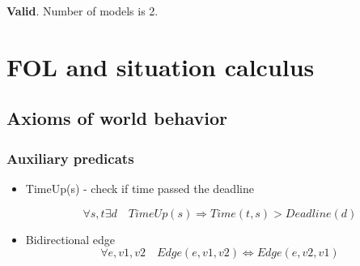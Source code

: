 \documentclass{article}                     %
\begin{document}
	\textbf{Valid}.  Number of models is 2.
	
	
	\section{FOL and situation calculus}		

	\subsection{Axioms of world behavior}
	
	\subsubsection{Auxiliary predicats }
	\begin{itemize}
		\item TimeUp(s) - check if time passed the deadline
		
\begin{equation}\label{key}
		 \forall s, t \exists d \quad TimeUp(s) \Rightarrow Time(t, s) > Deadline(d) 
\end{equation}
		
		\item Bidirectional edge
		\begin{equation}\label{key}
		 \forall e, v1, v2 \quad Edge(e, v1, v2) \Leftrightarrow Edge(e, v2, v1) 
		\end{equation}
		
	\end{itemize}
\end{document}
